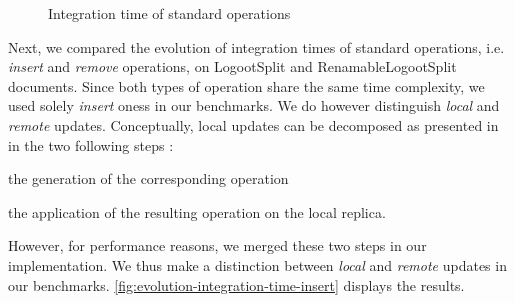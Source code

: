 \documentclass[10pt,journal,compsoc]{IEEEtran}
\let\MYoriglatexcaption\caption
\renewcommand{\caption}[2][\relax]{\MYoriglatexcaption[#2]{#2}}
\newcommand{\ie}{i.e. }
\begin{document}
\begin{figure}[t!]
    \centering
    \hfil
    \caption{Integration time of standard operations}
    \label{fig:evolution-integration-time-insert}
\end{figure}

Next, we compared the evolution of integration times of standard operations, \ie \emph{insert} and \emph{remove} operations, on LogootSplit and RenamableLogootSplit documents.
Since both types of operation share the same time complexity, we used solely \emph{insert} oness in our benchmarks.
We do however distinguish \emph{local} and \emph{remote} updates.
Conceptually, local updates can be decomposed as presented in \cite{baquero2017pure} in the two following steps :
\begin{enumerate*}[label=(\roman*)]
    \item the generation of the corresponding operation
    \item the application of the resulting operation on the local replica.
\end{enumerate*}
However, for performance reasons, we merged these two steps in our implementation.
We thus make a distinction between \emph{local} and \emph{remote} updates in our benchmarks.
\autoref{fig:evolution-integration-time-insert} displays the results.
\end{document}
